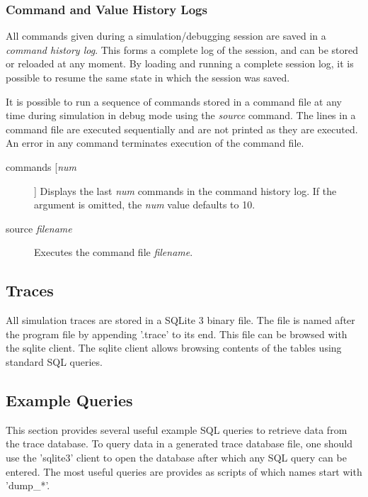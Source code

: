 \documentclass[twoside]{tceusermanual}
\begin{document}
\subsubsection{Command and Value History Logs}
\label{ssec:debug-history}

All commands given during a simulation/debugging session are saved in a
\emph{command history log}.  This forms a complete log of the session, and
can be stored or reloaded at any moment.  By loading and running a complete
session log, it is possible to resume the same state in which the session
was saved.

It is possible to run a sequence of commands stored in a command file at any
time during simulation in debug mode using the \emph{source} command.  The
lines in a command file are executed sequentially and are not printed as
they are executed.  An error in any command terminates execution of the
command file.

\begin{description}
\item[commands [\emph{num}]]%
  Displays the last \emph{num} commands in the command history log. If
  the argument is omitted, the \emph{num} value defaults to 10.

\item[source \emph{filename}]%
  Executes the command file \emph{filename}.

\end{description}

\subsection{Traces}
\label{sec:traces}

All simulation traces are stored in a SQLite 3 binary file. The file is
named after the program file by appending '.trace' to its end. This file can be
browsed with the sqlite client. The sqlite client allows browsing contents of
the tables using standard SQL queries.

\subsection{Example Queries}
\label{ssec:tracedb_tables}

This section provides several useful example SQL queries to retrieve data from
the trace database. To query data in a generated trace database file, one should
use the 'sqlite3' client to open the database after which any SQL query can
be entered. The most useful queries are provides as scripts of which
names start with 'dump\_*'.
\end{document}
